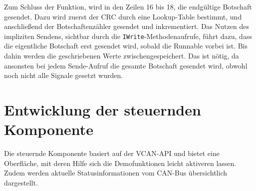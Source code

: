 \documentclass[
  a4paper,					    %
  twoside,
  DIV=calc,     				%
  bibliography=totoc,
  cleardoublepage=empty,
  ngerman,     					%
  final       					%
]{scrbook}
\begin{document}
Zum Schluss der Funktion, wird in den Zeilen 16 bis 18, die endgültige Botschaft gesendet. Dazu wird zuerst der CRC durch eine Lookup-Table bestimmt, und anschließend der Botschaftenzähler gesendet und inkrementiert. Das Nutzen des impliziten Sendens, sichtbar durch die \texttt{IWrite}-Methodenaufrufe, führt dazu, dass die eigentliche Botschaft erst gesendet wird, sobald die Runnable vorbei ist. Bis dahin werden die geschriebenen Werte zwischengespeichert. Das ist nötig, da ansonsten bei jedem Sende-Aufruf die gesamte Botschaft gesendet wird, obwohl noch nicht alle Signale gesetzt wurden.









\section{Entwicklung der steuernden Komponente}
\label{sec:entwicklung_vcan_app}
Die steuernde Komponente basiert auf der VCAN-API und bietet eine Oberfläche, mit deren Hilfe sich die Demofunktionen leicht aktiveren lassen. Zudem werden aktuelle Statusinformationen vom CAN-Bus übersichtlich dargestellt. 
\end{document}
